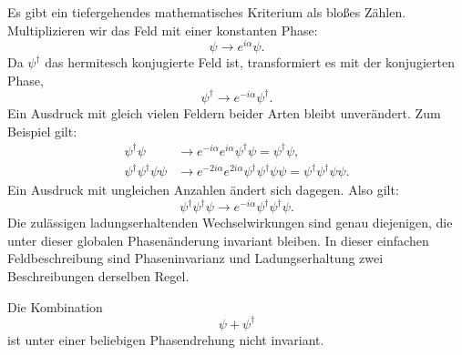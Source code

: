 \begin{classroomqa}\end{classroomqa}

Es gibt ein tiefergehendes mathematisches Kriterium als bloßes Zählen. Multiplizieren wir das Feld mit einer konstanten Phase:
\begin{equation}
\psi\longrightarrow e^{i\alpha}\psi.
\end{equation}
Da \(\psi^\dagger\) das hermitesch konjugierte Feld ist, transformiert es mit der konjugierten Phase,
\begin{equation}
\psi^\dagger\longrightarrow e^{-i\alpha}\psi^\dagger.
\end{equation}
Ein Ausdruck mit gleich vielen Feldern beider Arten bleibt unverändert. Zum Beispiel gilt:
\begin{align}
\psi^\dagger\psi
&\longrightarrow
e^{-i\alpha}e^{i\alpha}\psi^\dagger\psi
=\psi^\dagger\psi,\\
\psi^\dagger\psi^\dagger\psi\psi
&\longrightarrow
e^{-2i\alpha}e^{2i\alpha}
\psi^\dagger\psi^\dagger\psi\psi
=\psi^\dagger\psi^\dagger\psi\psi.
\end{align}
Ein Ausdruck mit ungleichen Anzahlen ändert sich dagegen. Also gilt:
\begin{equation}
\psi^\dagger\psi^\dagger\psi
\longrightarrow
e^{-i\alpha}\psi^\dagger\psi^\dagger\psi.
\end{equation}
Die zulässigen ladungserhaltenden Wechselwirkungen sind genau diejenigen, die unter dieser globalen Phasenänderung invariant bleiben. In dieser einfachen Feldbeschreibung sind Phaseninvarianz und Ladungserhaltung zwei Beschreibungen derselben Regel.

Die Kombination
\begin{equation}
\psi+\psi^\dagger
\end{equation}
ist unter einer beliebigen Phasendrehung nicht invariant.

\begin{classroomqa}\end{classroomqa}

